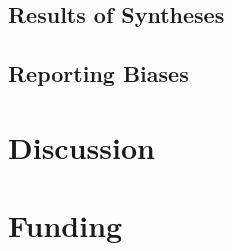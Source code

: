 \documentclass[12pt]{article}
\begin{document}
\subsection{Results of Syntheses}

\subsection{Reporting Biases}

\section{Discussion}

\section{Funding}



\end{document}
